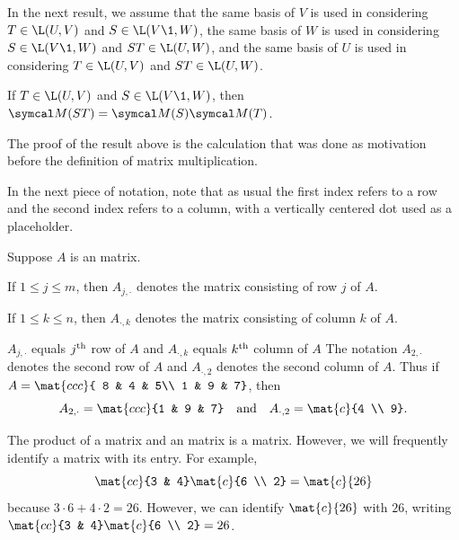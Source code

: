 In the next result, we assume that the same basis of $V$ is used in considering $T \in \L(U, V)$ and $S \in \L(V\1, W)$, the same basis of $W$ is used in considering $S \in \L(V\1, W)$ and $ST \in \L(U,W)$, and the same basis of $U$ is used in considering $T \in \L(U, V)$ and $ST \in \L(U, W)$.

{If $T \in \L(U, V)$ and $S \in \L(V\1, W)$, then $\M(ST) = \M(S) \M(T)$.}

The proof of the result above is the calculation that was done as motivation before the definition of matrix multiplication.

In the next piece of notation, note that as usual the first index refers to a row and the second index refers to a column, with a vertically centered dot used as a placeholder.

{Suppose $A$ is an  matrix.
\begin{Itemize}
\item
If $1 \le j \le m$, then $A_{j, \cdot}$ denotes the  matrix consisting of row $j$ of $A$.
\item
If $1 \le k \le n$, then $A_{\cdot, k}$ denotes the  matrix consisting of column $k$ of $A$.
\end{Itemize}}

\begin{example}{$A_{j,\cdot}$ equals\/ $j^{\text{{th}}}$ row of\/ $A$ and $A_{\cdot, k}$ equals\/ $k^{\text{{th}}}$ column of\/ $A$}
The notation $A_{2,\cdot}$ denotes the second row of $A$ and $A_{\cdot, 2} $ denotes the second column of $A$.
Thus if $A = \mat{ccc}{ 8 & 4 & 5\\ 1 & 9 & 7}$, then
\[
A_{2,\cdot} = \mat{ccc}{1 & 9 & 7} \andd
A_{\cdot, 2} = \mat{c}{4 \\ 9}.
\]
\vspace{-.2in}
\end{example}

The product of a  matrix and an  matrix is a  matrix. However, we will frequently identify a  matrix with its entry.
For example,
\[
\mat{cc}{3 & 4} \mat{c}{6 \\ 2} = \mat{c}{26}
\]
because $3 \cdot 6 + 4 \cdot 2 = 26$. However, we can identify $\mat{c}{26}$ with $26$, writing $\mat{cc}{3 & 4} \mat{c}{6 \\ 2} = 26$.

